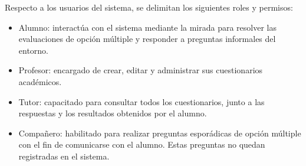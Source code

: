 Respecto a los usuarios del sistema, se delimitan los siguientes roles y permisos:

\begin{itemize}
    \item Alumno: interactúa con el sistema mediante la mirada para resolver las evaluaciones de opción múltiple y responder a preguntas informales del entorno.
    \item Profesor: encargado de crear, editar y administrar sus cuestionarios académicos.
    \item Tutor: capacitado para consultar todos los cuestionarios, junto a las respuestas y los resultados obtenidos por el alumno.
    \item Compañero: habilitado para realizar preguntas esporádicas de opción múltiple con el fin de comunicarse con el alumno. Estas preguntas no quedan registradas en el sistema.
\end{itemize}

